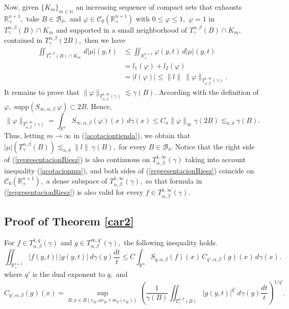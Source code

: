 \documentclass[leqno,11pt]{amsart}
\theoremstyle{plain}
\theoremstyle{remark}
\begin{document}
{{Now, given $\{K_m\}_{m\in {\mathbb N}}$ an increasing sequence of compact sets that exhausts $\mathbb{R}^{n+1}_+,$ take $B\in \mathscr{B}_\delta,$ 
and $\varphi\in \mathscr{C}_0(\mathbb{R}^{n+1}_+)$ with $0\le \varphi\le 1,$ $\varphi=1$ in $T^{\alpha,\beta}_\gamma(B)\cap K_m$ and supported in a small neighborhood of $T^{\alpha,\beta}_\gamma(B)\cap K_m,$ contained in $T^{\alpha,\beta}_{\gamma}(2B),$ then we have 
\begin{align}\label{acotaciontienda}
\iint_{T^{\alpha, \beta}_\gamma(B)\cap K_m}\, d|\mu|(y,t)&\le \iint_{\mathbb{R}^{n+1}_+} \varphi (y,t)\, d|\mu|(y,t)\\ &=l_1(\varphi)+l_2(\varphi)\nonumber\\ &= |l(\varphi)| \le \|l\|\ \|\varphi\|_{T^{1,\infty}_{\alpha, \beta}(\gamma)}.\nonumber
\end{align}
It remains to prove that $\|\varphi\|_{T^{1,\infty}_{\alpha, \beta}(\gamma)}\lesssim \gamma(B).$ According with the definition of $\varphi,$ $\text{supp}(S_{\infty, \alpha, \beta}\ \varphi)\subset 2 B.$ Hence, $$\|\varphi\|_{T^{1,\infty}_{\alpha,\beta}(\gamma)} =\int_{\mathbb{R}^{n}}S_{\infty, \alpha, \beta}(\varphi)(x)\, d\gamma(x) \le C_n \|\varphi\|_\infty \gamma(2 B)\lesssim_{n,\delta} \gamma(B).$$ 
Thus, letting $m\to \infty$ in (\ref{acotaciontienda}), we obtain that $|\mu|(T^{\alpha, \beta}_{\gamma}(B))\lesssim_{n,\delta} \|l\|\ \gamma(B),$ for every $B\in \mathscr{B}_\delta.$ 
Notice that the right side of (\ref{representacionRiesz}) is also continuous on $T^{1,\infty}_{\alpha,\beta}(\gamma)$ taking into account inequality (\ref{acotacionmu}), and both sides of (\ref{representacionRiesz}) coincide on $\mathscr{C}_0(\mathbb{R}^{n+1}_+),$ a dense subspace of $T_{\alpha, \beta}^{1,\infty}(\gamma),$ so that formula in  (\ref{representacionRiesz}) is also valid for every $f\in T^{1,\infty}_{\alpha, \beta}(\gamma).$
 
\subsection{Proof of Theorem \ref{car2}}\label{car2proof}

For $f\in T^{1,q}_{\alpha, \beta}(\gamma)$ and $g\in T^{\infty, q'}_{\alpha,\beta} (\gamma),$ the following inequality holds.
\begin{equation}\label{dual1inftygral}
\iint_{\mathbb{R}^{n+1}_+}|f(y,t)|\, |g(y,t)|\ d\gamma(y)\frac{dt}{t}\le C \int_{\mathbb{R}^n}S_{q,\alpha,\beta} (f)(x)\, C_{q', \alpha,\beta}(g)(x)\, d\gamma(x).
\end{equation}
where $q'$ is the dual exponent to $q,$ and $$C_{q',\alpha,\beta} (g)(x)=\sup_{B: x\in B(c_B,  \alpha r_B\wedge m_\beta(c_B))}\left(\frac{1}{\gamma(B)}\iint_{T^{\alpha,\beta}_\gamma(B)}|g(y,t)|^{q'}\, d\gamma(y)\frac{dt}{t}\right)^{1/q'}.$$}

}
\end{document}
